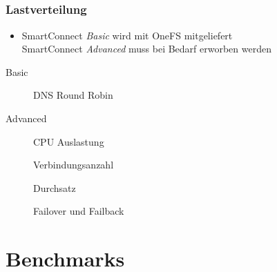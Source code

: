 \documentclass{beamer}
\begin{document}
\subsection{}
\begin{frame}[fragile]
  \frametitle{Lastverteilung}

  \begin{itemize}
    \item[] SmartConnect \emph{Basic} wird mit OneFS mitgeliefert \\ SmartConnect \emph{Advanced} muss bei Bedarf erworben werden
  \end{itemize}
  
  \vspace{3mm}
  
  \begin{description}
    \item[Basic] DNS Round Robin
    \vspace{3mm}
    \item[Advanced] CPU Auslastung
    \item[] Verbindungsanzahl
    \item[] Durchsatz 
    \vspace{3mm}
    \item[] Failover und Failback
  \end{description}

\end{frame}  

\section{Benchmarks}
\end{document}
